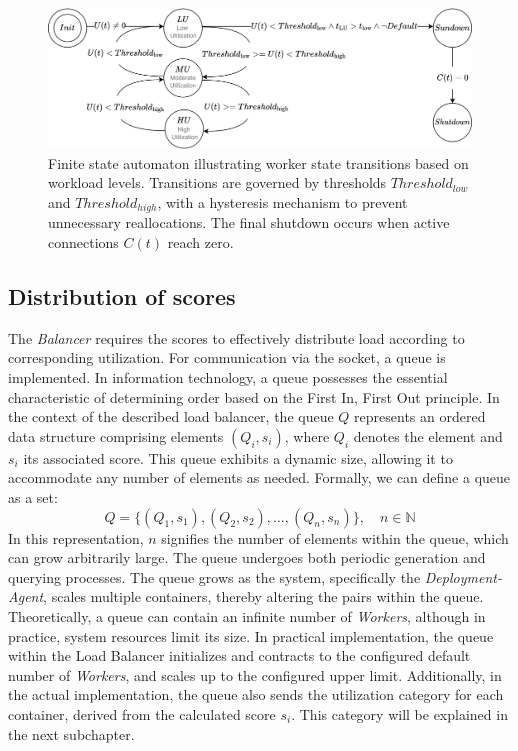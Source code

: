 \documentclass[twocolumn]{webofc}
\begin{document}
\begin{figure}[htbp]
    \centering
    \includegraphics[width=\textwidth]{utilizations.drawio.png}
    \caption{Finite state automaton illustrating worker state transitions based on workload levels. Transitions are governed by thresholds $Threshold_{low}$ and $Threshold_{high}$, with a hysteresis mechanism to prevent unnecessary reallocations. The final shutdown occurs when active connections $C(t)$ reach zero.}
    \label{fig:automat}
\end{figure}

\subsection{Distribution of scores}
The \textit{Balancer} requires the scores to effectively distribute load according to corresponding utilization. For communication via the socket, a queue is implemented. In information technology, a queue possesses the essential characteristic of determining order based on the First In, First Out principle\cite{black2020queue}. In the context of the described load balancer, the queue \( Q \) represents an ordered data structure comprising elements \( (Q_i, s_i) \), where \( Q_i \) denotes the element and \( s_i \) its associated score. This queue exhibits a dynamic size, allowing it to accommodate any number of elements as needed. Formally, we can define a queue as a set:
$$Q = \{ (Q_1, s_1), (Q_2, s_2), \dots, (Q_n, s_n) \}, \quad n \in \mathbb{N}$$
In this representation, \( n \) signifies the number of elements within the queue, which can grow arbitrarily large. The queue undergoes both periodic generation and querying processes. The queue grows as the system, specifically the \textit{Deployment-Agent}, scales multiple containers, thereby altering the pairs within the queue. Theoretically, a queue can contain an infinite number of \textit{Workers}, although in practice, system resources limit its size. In practical implementation, the queue within the Load Balancer initializes and contracts to the configured default number of \textit{Workers}, and scales up to the configured upper limit. Additionally, in the actual implementation, the queue also sends the utilization category for each container, derived from the calculated score \( s_i \). This category will be explained in the next subchapter.
\end{document}
